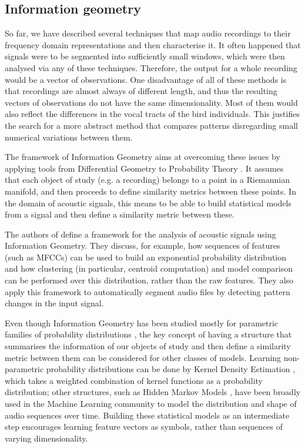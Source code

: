 \documentclass[../main.tex]{subfiles} \label{chapter_soa}
\begin{document}
\subsection{Information geometry} \label{subsection_infgeom}
So far, we have described several techniques that map audio recordings to their frequency domain representations and then characterise it. It often happened that signals were to be segmented into sufficiently small windows, which were then analysed via any of these techniques. Therefore, the output for a whole recording would be a vector of observations. One disadvantage of all of these methods is that recordings are almost always of different length, and thus the resulting vectors of observations do not have the same dimensionality. Most of them would also reflect the differences in the vocal tracts of the bird individuals. This justifies the search for a more abstract method that compares patterns disregarding small numerical variations between them. 
\par The framework of Information Geometry aims at overcoming these issues by applying tools from Differential Geometry to Probability Theory \cite{Wang2009}. It assumes that each object of study (e.g. a recording) belongs to a point in a Riemannian manifold, and then proceeds to define similarity metrics between these points. In the domain of acoustic signals, this means to be able to build statistical models from a signal and then define a similarity metric between these.
\par The authors of \cite{Cont2011} define a framework for the analysis of acoustic signals using Information Geometry. They discuss, for example, how sequences of features (such as MFCCs) can be used to build an exponential probability distribution and how clustering (in particular, centroid computation) and model comparison can be performed over this distribution, rather than the raw features. They also apply this framework to automatically segment audio files by detecting pattern changes in the input signal.
\par Even though Information Geometry has been studied mostly for parametric families of probability distributions \cite{Amari2001}, the key concept of having a structure that summarises the information of our objects of study and then define a similarity metric between them can be considered for other classes of models. Learning non-parametric probability distributions can be done by Kernel Density Estimation \cite{Goodall2008}, which takes a weighted combination of kernel functions as a probability distribution; other structures, such as Hidden Markov Models \cite{Chou2008,Muda2010,Hsieh2009,Wielgat2012}, have been broadly used in the Machine Learning community to model the distribution and shape of audio sequences over time. Building these statistical models as an intermediate step encourages learning feature vectors as symbols, rather than sequences of varying dimensionality.
\end{document}
